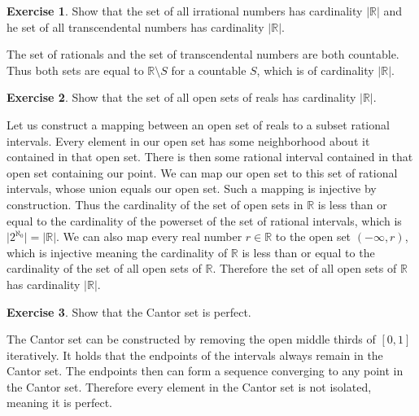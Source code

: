 \documentclass{article}
\theoremstyle{definition}
\newtheorem{exer}{Exercise}[section]
\newcommand{\R}{\mathbb{R}}
\newcommand{\abs}[1]{\lvert#1\rvert}
\newlength{\defparindent}
\newenvironment{answer}
    {\begin{mdframed}[backgroundcolor=gray!15, linewidth=0pt] \setlength{\parindent}{\defparindent}}
    {\end{mdframed}}
\begin{document}
\begin{exer}
    Show that the set of all irrational numbers has cardinality $\abs{\R}$ and he set of all transcendental numbers has cardinality $\abs{\R}$.
    \begin{answer}
        The set of rationals and the set of transcendental numbers are both countable. Thus both sets are equal to $\R \setminus S$ for a countable $S$, which is of cardinality $\abs{\R}$.
    \end{answer}
\end{exer}

\newpage

\begin{exer}
    Show that the set of all open sets of reals has cardinality $\abs{\R}$.
    \begin{answer}
        Let us construct a mapping between an open set of reals to a subset rational intervals. Every element in our open set has some neighborhood about it contained in that open set. There is then some rational interval contained in that open set containing our point. We can map our open set to this set of rational intervals, whose union equals our open set. Such a mapping is injective by construction. Thus the cardinality of the set of open sets in $\R$ is less than or equal to the cardinality of the powerset of the set of rational intervals, which is $\abs{2^{\aleph_0}} = \abs{\R}$. We can also map every real number $r \in \R$ to the open set $(-\infty, r)$, which is injective meaning the cardinality of $\R$ is less than or equal to the cardinality of the set of all open sets of $\R$. Therefore the set of all open sets of $\R$ has cardinality $\abs{\R}$.
    \end{answer}
\end{exer}

\begin{exer}
    Show that the Cantor set is perfect.
    \begin{answer}
        The Cantor set can be constructed by removing the open middle thirds of $[0, 1]$ iteratively. It holds that the endpoints of the intervals always remain in the Cantor set. The endpoints then can form a sequence converging to any point in the Cantor set. Therefore every element in the Cantor set is not isolated, meaning it is perfect. 
    \end{answer}
\end{exer}
\end{document}
